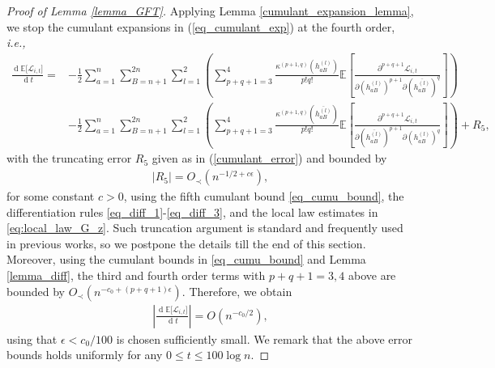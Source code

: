 \documentclass[10pt,reqno]{amsart}
\numberwithin{equation}{section}
\numberwithin{figure}{section}
\theoremstyle{plain}
\newcommand{\<}{\langle}
\renewcommand{\>}{\rangle}
\newcommand{\dd}{\operatorname{d}\!{}}
\newcommand{\ie}{\emph{i.e., }}
\newcommand{\II}{\mathcal{L}_{i,t}}
\begin{document}
\begin{proof}[Proof of Lemma \ref{lemma_GFT}]
 Applying Lemma \ref{cumulant_expansion_lemma}, we stop the cumulant expansions in (\ref{eq_cumulant_exp}) at the fourth order, \ie 
\begin{align}\label{eq_derivative_F0}
	 \frac{\dd \mathbb{E}\big[ \II\big]}{\dd t}
	=&-\frac{1}{2} \sum_{a=1}^n \sum_{B=n+1}^{2n}
	\sum_{l=1}^2 \left( \sum_{p+q+1= 3}^{4}\frac{\kappa^{(p+1,q)}(h^{(l)}_{aB})}{p!q!}
	\mathbb{E} \left[   \frac{\partial^{p+q+1} \II}{\partial (h^{(l)}_{aB})^{p+1} \partial (\overline{h^{(l)}_{aB}})^{q} } \right] \right)\nonumber\\
	&-\frac{1}{2} \sum_{a=1}^n \sum_{B=n+1}^{2n} \sum_{l=1}^2 \left(\sum_{p+q+1 = 3}^{4}\frac{\kappa^{(p+1,q)}(\overline{h^{(l)}_{aB}})}{p!q!}
	\mathbb{E} \left[   \frac{\partial^{p+q+1} \II }{\partial (\overline{h^{(l)}_{aB}})^{p+1} \partial (h^{(l)}_{aB})^{q}}\right]\right)+R_5,
\end{align}
with the truncating error $R_5$ given as in (\ref{cumulant_error}) and bounded by
\begin{align}\label{eq_error}
	|R_5|=O_\prec(n^{-1/2+c\epsilon}),
\end{align}
for some constant $c>0$, using the fifth cumulant bound \eqref{eq_cumu_bound}, the differentiation rules \eqref{eq_diff_1}-\eqref{eq_diff_3}, and the local law estimates in \eqref{eq:local_law_G_z}. Such truncation argument is standard and frequently used in previous works, so we postpone the details till the end of this section. Moreover, using  the cumulant bounds in \eqref{eq_cumu_bound} and Lemma \ref{lemma_diff}, the third and fourth order terms with $p+q+1=3,4$ above are bounded by $O_\prec(n^{-c_0+(p+q+1)\epsilon})$.  Therefore, we obtain
\begin{align}\label{eq_derivative_F}
	\left| \frac{\dd \mathbb{E}\big[ \II\big]}{\dd t}\right|=O(n^{-c_0/2}),
\end{align}
using that $\epsilon<c_0/100$ is chosen sufficiently small. We remark that the above error bounds holds uniformly for any $0\leq t\leq 100 \log n$. 	


\end{proof}
\end{document}
